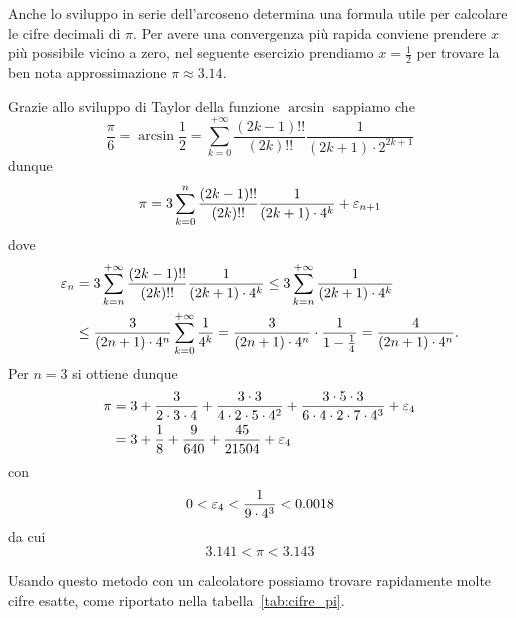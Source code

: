 Anche lo sviluppo in serie dell'arcoseno determina una formula utile per calcolare 
le cifre decimali di $\pi$. 
Per avere una convergenza più rapida conviene prendere $x$ più possibile 
vicino a zero, nel seguente esercizio prendiamo $x=\frac 1 2$ per trovare 
la ben nota approssimazione $\pi \approx 3.14$.

\begin{exercise}
  \label{ex:cifre_pi}
  Grazie allo sviluppo di Taylor della funzione $\arcsin$
  sappiamo che
  \[
    \frac \pi 6
    = \arcsin \frac 1 2
    = \sum_{k=0}^{+\infty} \frac{(2k-1)!!}{(2k)!!} \frac{1}{(2k+1)\cdot 2^{2k+1}}
  \]
  dunque
  \[
    \pi = 3 \sum_{k=0}^n \frac{(2k-1)!!}{(2k)!!} \frac{1}{(2k+1)\cdot 4^k} + \varepsilon_{n+1}
  \]
  dove
  \begin{align*}
   \varepsilon_n
   &= 3 \sum_{k=n}^{+\infty} \frac{(2k-1)!!}{(2k)!!} \frac{1}{(2k+1)\cdot 4^k}
   \le 3 \sum_{k=n}^{+\infty} \frac{1}{(2k+1)\cdot 4^k} \\
   &\le \frac{3}{(2n+1)\cdot 4^n} \sum_{k=0}^{+\infty} \frac{1}{4^k}
   = \frac{3}{(2n+1)\cdot 4^n} \cdot \frac{1}{1-\frac 1 4}
   = \frac{4}{(2n+1)\cdot 4^n}.
 \end{align*}
 Per $n=3$ si ottiene dunque
 \begin{align*}
  \pi
  &= 3 + \frac{3}{2\cdot 3 \cdot 4} + \frac{3\cdot 3}{4\cdot 2 \cdot 5 \cdot 4^2}
  + \frac{3\cdot 5\cdot 3}{6\cdot 4\cdot 2 \cdot 7 \cdot 4^3} + \varepsilon_4 \\
  &= 3+\frac{1}{8} + \frac{9}{640} + \frac{45}{21504} + \varepsilon_4
\end{align*}
 con
 \[
 0 < \varepsilon_4 < \frac{1}{9\cdot 4^3} < 0.0018
 \]
 da cui
 \[
   3.141 < \pi < 3.143
 \]

 Usando questo metodo con un calcolatore possiamo trovare rapidamente molte
 cifre esatte, come riportato nella tabella~\ref{tab:cifre_pi}.
\end{exercise}
%

